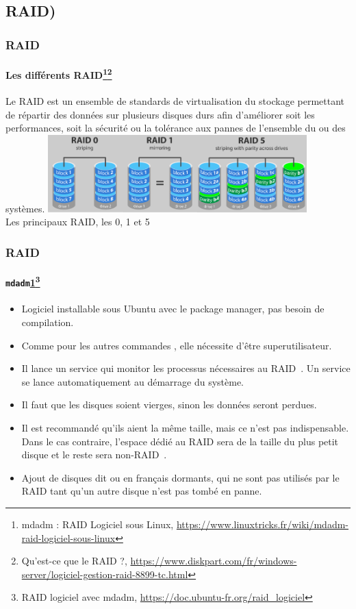 \documentclass{beamer}
\begin{document}
    \subsection{RAID)}\label{subsec:raid}

    \begin{frame}
        \transdissolve
        \frametitle{RAID}
        \framesubtitle{Les différents RAID\footnote{\label{mdadm}mdadm : RAID Logiciel sous Linux, \url{https://www.linuxtricks.fr/wiki/mdadm-raid-logiciel-sous-linux}}\footnotestep\footnote{Qu'est-ce que le RAID ?, \url{https://www.diskpart.com/fr/windows-server/logiciel-gestion-raid-8899-tc.html}}}
        Le RAID est un ensemble de standards de virtualisation du stockage permettant de répartir des données sur plusieurs disques durs afin d'améliorer soit les performances, soit la sécurité ou la tolérance aux pannes de l'ensemble du ou des systèmes.
        \bigbreak
        \centering
        \includegraphics[width=10cm]{image/raid-0-1-5} \\ Les principaux RAID, les 0, 1 et 5 \\
    \end{frame}

    \begin{frame}
        \transdissolve
        \frametitle{RAID}
        \framesubtitle{\lstinline{mdadm}\cref{mdadm}\footnotestep\footnote{RAID logiciel avec mdadm, \url{https://doc.ubuntu-fr.org/raid_logiciel}}}
        \begin{itemize}
            \item Logiciel installable sous Ubuntu avec le package manager, pas besoin de compilation.
            \item Comme pour les autres commandes , elle nécessite d'être superutilisateur.
            \item Il lance un service qui monitor les processus nécessaires au RAID~.
            Un service se lance automatiquement au démarrage du système.
            \item Il faut que les disques soient vierges, sinon les données seront perdues.
            \item Il est recommandé qu'ils aient la même taille, mais ce n'est pas indispensable.
            Dans le cas contraire, l'espace dédié au RAID sera de la taille du plus petit disque et le reste sera non-RAID~.
            \item Ajout de disques dit  ou en français dormants, qui ne sont pas utilisés par le RAID tant qu'un autre disque n'est pas tombé en panne.
        \end{itemize}
    \end{frame}
\end{document}

